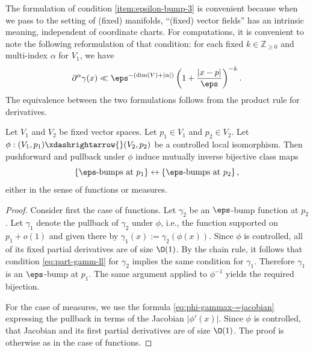 \begin{remark}
  The formulation of condition \eqref{item:epsilon-bump-3} is convenient because when we pass to the setting of (fixed) manifolds, ``(fixed) vector fields'' has an intrinsic meaning, independent of coordinate charts.  For computations, it is convenient to note the following reformulation of that condition: for each fixed $k \in \mathbb{Z}_{\geq 0}$ and multi-index $\alpha$ for $V_1$, we have
  \begin{equation}\label{eq:part-gamm-ll}
    \partial^\alpha \gamma(x) \ll \eps^{ -(\dim (V) + |\alpha|)}  \left( 1 + \frac{|x-p|}{\eps} \right)^{-k}.
  \end{equation}
  The equivalence between the two formulations follows from the product rule for derivatives.
\end{remark}

\begin{lemma}\label{lem:let-v_1-v_2}
  Let $V_1$ and $V_2$ be fixed vector spaces.  Let $p_1 \in V_1$ and $p_2 \in V_2$.  Let $\phi : (V_1,p_1) \xdashrightarrow{} (V_2,p_2)$ be a controlled local isomorphism.  Then pushforward and pullback under $\phi$ induce mutually inverse bijective class maps
  \begin{equation}\label{eq:lefttexteps-bumps-at}
    \left\{\text{$\eps$-bumps at $p_1$} \right\}
    \leftrightarrow
    \left\{\text{$\eps$-bumps at $p_2$} \right\},
  \end{equation}
  either in the sense of functions or measures.
\end{lemma}
\begin{proof}
  Consider first the case of functions.  Let $\gamma_2$ be an $\eps$-bump function at $p_2$.  Let $\gamma_1$ denote the pullback of $\gamma_2$ under $\phi$, i.e., the function supported on $p_1 + o(1)$ and given there by $\gamma_1(x) := \gamma_2(\phi(x))$.  Since $\phi$ is controlled, all of its fixed partial derivatives are of size $\O(1)$.  By the chain rule, it follows that condition \eqref{eq:part-gamm-ll} for $\gamma_2$ implies the same condition for $\gamma_1$.  Therefore $\gamma_1$ is an $\eps$-bump at $p_1$.  The same argument applied to $\phi^{-1}$ yields the required bijection.

  For the case of measures, we use the formula \eqref{eq:phi-gammax-=jacobian} expressing the pullback in terms of the Jacobian $|\phi '(x)|$.  Since $\phi$ is controlled, that Jacobian and its first partial derivatives are of size $\O(1)$.  The proof is otherwise as in the case of functions.
\end{proof}

